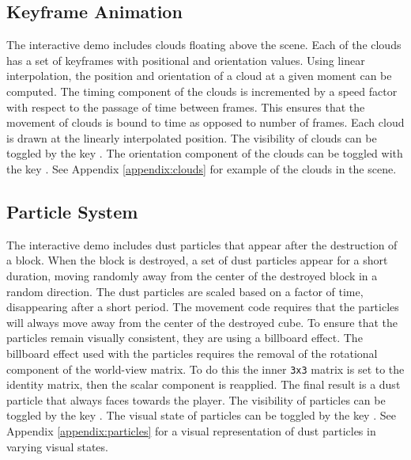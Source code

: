\documentclass[a4paper,11pt,titlepage]{scrartcl}
\begin{document}
\subsection{Keyframe Animation}
\label{section:animation}
The interactive demo includes clouds floating above the scene. Each of the clouds has a set of keyframes with positional and orientation values. Using linear interpolation, the position and orientation of a cloud at a given moment can be computed. The timing component of the clouds is incremented by a speed factor with respect to the passage of time between frames. This ensures that the movement of clouds is bound to time as opposed to number of frames. Each cloud is drawn at the linearly interpolated position.
\vskip 2.5mm\noindent
The visibility of clouds can be toggled by the key . The orientation component of the clouds can be toggled with the key . See Appendix \ref{appendix:clouds} for example of the clouds in the scene.

\subsection{Particle System}
\label{section:particles}
The interactive demo includes dust particles that appear after the destruction of a block. When the block is destroyed, a set of dust particles appear for a short duration, moving randomly away from the center of the destroyed block in a random direction. The dust particles are scaled based on a factor of time, disappearing after a short period. The movement code requires that the particles will always move away from the center of the destroyed cube. To ensure that the particles remain visually consistent, they are using a billboard effect. The billboard effect used with the particles requires the removal of the rotational component of the world-view matrix. To do this the inner \texttt{3x3} matrix is set to the identity matrix, then the scalar component is reapplied. The final result is a dust particle that always faces towards the player.
\vskip 2.5mm\noindent
The visibility of particles can be toggled by the key . The visual state of particles can be toggled by the key . See Appendix \ref{appendix:particles} for a visual representation of dust particles in varying visual states.
\end{document}
